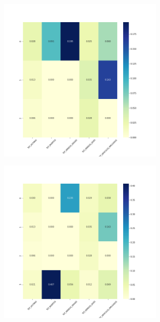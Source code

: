\begin{figure}[H]
\begin{subfigure}{.5\textwidth}
  \centering
  \includegraphics[width=0.9\textwidth]{imagenes/case1/agglomerative/heatmaps/hm_agglomerative_case1_salida_k3.png}
\end{subfigure}%
\begin{subfigure}{.5\textwidth}
  \centering
  \includegraphics[width=0.9\textwidth]{imagenes/case1/agglomerative/heatmaps/hm_agglomerative_case1_salida_k4.png}

\end{subfigure}
\end{figure}
